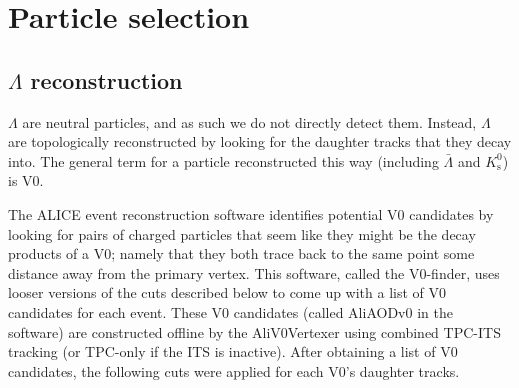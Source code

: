 \section{Particle selection}
\label{sec:ParticleSelection}


\subsection{\texorpdfstring{$\Lambda$}{Lambda} reconstruction}
\label{sec:Recon}

$\Lambda$ are neutral particles, and as such we do not directly detect them.  
Instead, $\Lambda$ are topologically reconstructed by looking for the daughter tracks that they decay into.  
The general term for a particle reconstructed this way (including $\bar{\Lambda}$ and $K^0_\mathrm{s}$) is V0.

The ALICE event reconstruction software identifies potential V0 candidates by looking for pairs of charged particles that seem like they might be the decay products of a V0; namely that they both trace back to the same point some distance away from the primary vertex.
This software, called the V0-finder, uses looser versions of the cuts described below to come up with a list of V0 candidates for each event.
These V0 candidates (called AliAODv0 in the software) are constructed offline by the AliV0Vertexer using combined TPC-ITS tracking (or TPC-only if the ITS is inactive).  
After obtaining a list of V0 candidates, the following cuts were applied for each V0's daughter tracks.

